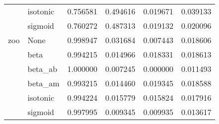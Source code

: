 \begin{tabular}{llrrrr}
        & isotonic &  0.756581 &  0.494616 &  0.019671 &  0.039133 \\
        & sigmoid &  0.760272 &  0.487313 &  0.019132 &  0.020096 \\
zoo & None &  0.998947 &  0.031684 &  0.007443 &  0.018606 \\
        & beta &  0.994215 &  0.014966 &  0.018331 &  0.018613 \\
        & beta\_ab &  1.000000 &  0.007245 &  0.000000 &  0.011493 \\
        & beta\_am &  0.993215 &  0.014460 &  0.019345 &  0.018588 \\
        & isotonic &  0.994224 &  0.015779 &  0.015824 &  0.017916 \\
        & sigmoid &  0.997995 &  0.009345 &  0.009935 &  0.013617 \\
\bottomrule
\end{tabular}
